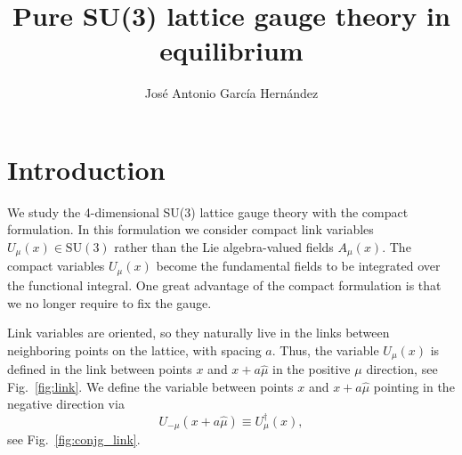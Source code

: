 \documentclass[12pt,a4paper]{article}
\author{José Antonio García Hernández}
\title{Pure SU(3) lattice gauge theory in equilibrium}
\begin{document}
\maketitle

\section{Introduction}
We study the 4-dimensional SU(3) lattice gauge theory with the compact formulation. In this formulation we consider compact link variables $U_{\mu}(x)\in \text{SU}(3)$ rather than the Lie algebra-valued fields $A_{\mu}(x)$. The compact variables $U_{\mu}(x)$ become the fundamental fields to be integrated over the functional integral. One great advantage of the compact formulation is that we no longer require to fix the gauge.

Link variables are oriented, so they naturally live in the links between neighboring points on the lattice, with spacing $a$. Thus, the variable $U_{\mu}(x)$ is defined in the link between points $x$ and $x + a\hat \mu$ in the positive $\mu$ direction, see Fig.\ \ref{fig:link}. We define the variable between points $x$ and $x + a\hat \mu$ pointing in the negative direction via
\begin{equation}
	U_{-\mu}(x+a\hat\mu) \equiv  U^{\dagger}_{\mu}(x),
\end{equation}
see Fig.\ \ref{fig:conjg_link}.
\end{document}
